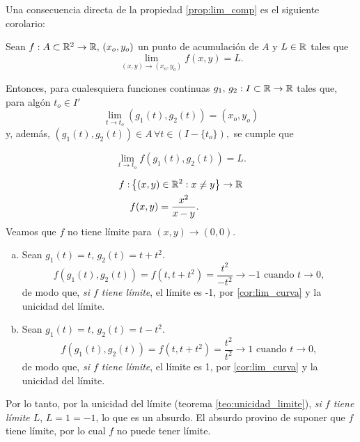 Una consecuencia directa de la propiedad \eqref{prop:lim_comp} es el siguiente corolario: 
\begin{corollary}  \label{cor:lim_curva}
  Sean $f: A \subset \mathbb{R}^2 \to \mathbb{R}, \, (x_o,y_o)$ un punto de acumulaci\'on de $A$ y $L \in \mathbb{R}$ tales que 
  \[
   \lim_{(x,y) \to (x_o,y_o)} f(x,y) = L.
  \]

  Entonces, para cualesquiera funciones continuas $g_1, \, g_2 : I \subset \mathbb{R} \to \mathbb{R}$ tales que, para alg\'on $t_o \in I'$
  \[
    \lim_{t \to t_o} \left( g_1(t),g_2(t) \right) = \left( x_o , y_o \right)
  \]
  y, adem\'as, $\left( g_1(t), g_2(t) \right) \in A \, \forall t \in \left( I - \{t_o\} \right),$ se cumple que
  
  \[
   \lim_{t \to t_o} f\left( g_1(t),g_2(t) \right) = L.
  \]
\end{corollary}
\begin{example}
 \begin{align*}
   f: &\left\lbrace (x,y) \in \mathbb{R}^2 : x \ne y \right\rbrace \to \mathbb{R} \\
   &f(x,y) = \frac{x^2}{x - y}.
  \end{align*} 
  Veamos que $f$ no tiene l\'imite para $(x,y) \to (0,0)$.
  \begin{enumerate} [(a)]
   \item  Sean $g_1(t) = t, \, g_2(t) = t + t^2$.
  \[
   f(g_1(t),g_2(t)) = f(t,t + t^2) = \frac{t^2}{-t^2} \to -1 \text{ cuando } t \to 0,
  \]
  de modo que, \emph{si $f$ tiene l\'imite}, el l\'imite es -1, por \eqref{cor:lim_curva} y la unicidad del l\'imite.
  \item  Sean $g_1(t) = t, \, g_2(t) = t - t^2$.
  \[
   f(g_1(t),g_2(t)) = f(t,t + t^2) = \frac{t^2}{t^2} \to 1 \text{ cuando } t \to 0,
  \]
  de modo que, \emph{si $f$ tiene l\'imite}, el l\'imite es 1, por \eqref{cor:lim_curva} y la unicidad del l\'imite.
  \end{enumerate}
  Por lo tanto, por la unicidad del l\'imite (teorema \eqref{teo:unicidad_limite}), \emph{si $f$ tiene l\'imite $L$}, $L = 1 = -1$, lo que es un absurdo. El absurdo provino de suponer que $f$ tiene l\'imite, por lo cual $f$ no puede tener l\'imite.
\end{example}

